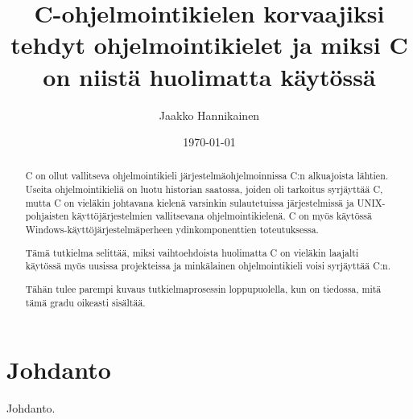 \documentclass{tktltiki}
\title{C-ohjelmointikielen korvaajiksi tehdyt ohjelmointikielet ja miksi C on
niistä huolimatta käytössä}
\author{Jaakko Hannikainen}
\date{\today}
\begin{document}
\maketitle




\begin{abstract}
    C on ollut vallitseva ohjelmointikieli järjestelmäohjelmoinnissa C:n
    alkuajoista lähtien. Useita ohjelmointikieliä on luotu historian saatossa,
    joiden oli tarkoitus syrjäyttää C, mutta C on vieläkin johtavana kielenä
    varsinkin sulautetuissa järjestelmissä ja UNIX-pohjaisten
    käyttöjärjestelmien vallitsevana ohjelmointikielenä. C on myös käytössä
    Windows-käyttöjärjestelmäperheen ydinkomponenttien toteutuksessa.
    
    Tämä tutkielma selittää, miksi vaihtoehdoista huolimatta C on vieläkin
    laajalti käytössä myös uusissa projekteissa ja minkälainen ohjelmointikieli
    voisi syrjäyttää C:n.
    
    Tähän tulee parempi kuvaus tutkielmaprosessin loppupuolella, kun on
    tiedossa, mitä tämä gradu oikeasti sisältää.

\end{abstract}

\mytableofcontents


\maketitle

\section{Johdanto} 
Johdanto.






\end{document}
